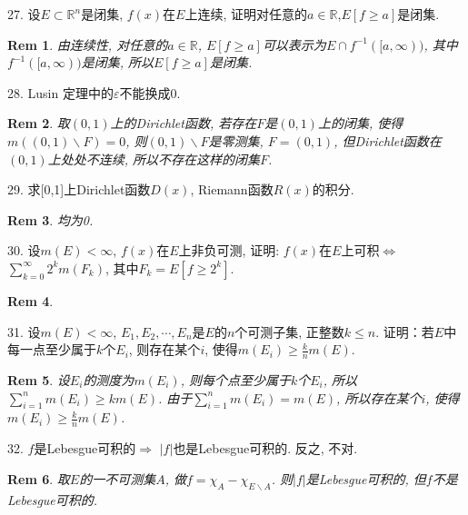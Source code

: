 \documentclass[UTF8]{article}
\newtheorem*{remark}{Rem}
\begin{document}
    27. 设$E\subset \mathbb{R}^n$是闭集,  $f(x)$在$E$上连续, 证明对任意的$a\in \mathbb{R}$,$E\left[f\geqslant a\right]$是闭集.\par
    \begin{remark}
        由连续性, 对任意的$a\in \mathbb{R}$, $E\left[f\geqslant a\right]$可以表示为$E\cap f^{-1}([a,\infty))$, 其中$f^{-1}([a,\infty))$是闭集, 所以$E\left[f\geqslant a\right]$是闭集.\par
    \end{remark}
    28. Lusin 定理中的$\varepsilon$不能换成0.\par
    \begin{remark}
        取$(0,1)$上的Dirichlet函数, 若存在$F$是$(0,1)$上的闭集, 使得$m((0,1)\backslash F)=0$, 则$(0,1)\backslash F$是零测集, $F=(0,1)$, 但Dirichlet函数在$(0,1)$上处处不连续, 所以不存在这样的闭集$F$.\par
    \end{remark}
    29. 求[0,1]上Dirichlet函数$D(x)$, Riemann函数$R(x)$的积分.\par
    \begin{remark}
        均为0.\par
    \end{remark}
    30. 设$m(E)<\infty$, $f(x)$在$E$上非负可测, 证明: $f(x)$在$E$上可积$\Leftrightarrow $ $\sum_{k=0}^{\infty}2^{k}m(F_k)$, 其中$F_k=E\left[f\geqslant 2^{k}\right]$.\par
    \begin{remark}
        
    \end{remark}
    31. 设$m(E)<\infty$, $E_1, E_2, \cdots, E_n$是$E$的$n$个可测子集, 正整数$k\leqslant n$. 证明：若$E$中每一点至少属于$k$个$E_i$, 则存在某个$i$, 使得$m(E_i)\geqslant \frac{k}{n}m(E)$.\par
    \begin{remark}
        设$E_i$的测度为$m(E_i)$, 则每个点至少属于$k$个$E_i$, 所以$\sum_{i=1}^{n}m(E_i)\geqslant km(E)$. 由于$\sum_{i=1}^{n}m(E_i)=m(E)$, 所以存在某个$i$, 使得$m(E_i)\geqslant \frac{k}{n}m(E)$.\par
    \end{remark}
    32. $f$是Lebesgue可积的$\Rightarrow$ $|f|$也是Lebesgue可积的. 反之, 不对.\par
    \begin{remark}
        取$E$的一不可测集$A$, 做$f=\chi_{A}-\chi_{E\backslash A}$. 则$|f|$是Lebesgue可积的, 但$f$不是Lebesgue可积的.\par
    \end{remark}
\end{document}
